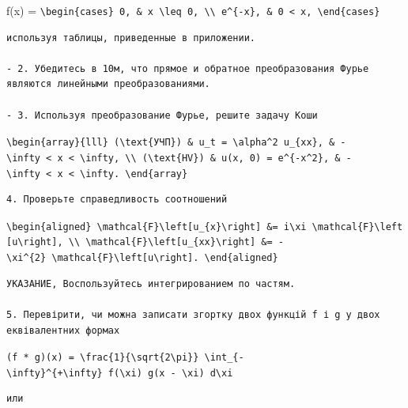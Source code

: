 \documentclass[
  ukrainian,
]{article}
\begin{document}
f(x) =
\texttt{\textbackslash{}begin\{cases\}\ 0,\ \&\ x\ \textbackslash{}leq\ 0,\ \textbackslash{}\textbackslash{}\ e\^{}\{-x\},\ \&\ 0\ \textless{}\ x,\ \textbackslash{}end\{cases\}}

\begin{verbatim}
используя таблицы, приведенные в приложении.

- 2. Убедитесь в 10м, что прямое и обратное преобразования Фурье являются линейными преобразованиями.

- 3. Используя преобразование Фурье, решите задачу Коши
\end{verbatim}

\texttt{\textbackslash{}begin\{array\}\{lll\}\ (\textbackslash{}text\{УЧП\})\ \&\ u\_t\ =\ \textbackslash{}alpha\^{}2\ u\_\{xx\},\ \&\ -\textbackslash{}infty\ \textless{}\ x\ \textless{}\ \textbackslash{}infty,\ \textbackslash{}\textbackslash{}\ (\textbackslash{}text\{HV\})\ \&\ u(x,\ 0)\ =\ e\^{}\{-x\^{}2\},\ \&\ -\textbackslash{}infty\ \textless{}\ x\ \textless{}\ \textbackslash{}infty.\ \textbackslash{}end\{array\}}

\begin{verbatim}
4. Проверьте справедливость соотношений
\end{verbatim}

\texttt{\textbackslash{}begin\{aligned\}\ \textbackslash{}mathcal\{F\}\textbackslash{}left{[}u\_\{x\}\textbackslash{}right{]}\ \&=\ i\textbackslash{}xi\ \textbackslash{}mathcal\{F\}\textbackslash{}left{[}u\textbackslash{}right{]},\ \textbackslash{}\textbackslash{}\ \textbackslash{}mathcal\{F\}\textbackslash{}left{[}u\_\{xx\}\textbackslash{}right{]}\ \&=\ -\textbackslash{}xi\^{}\{2\}\ \textbackslash{}mathcal\{F\}\textbackslash{}left{[}u\textbackslash{}right{]}.\ \textbackslash{}end\{aligned\}}

\begin{verbatim}
УКАЗАНИЕ, Воспользуйтесь интегрированием по частям.

5. Перевірити, чи можна записати згортку двох функцій f і g у двох еквівалентних формах
\end{verbatim}

\texttt{(f\ *\ g)(x)\ =\ \textbackslash{}frac\{1\}\{\textbackslash{}sqrt\{2\textbackslash{}pi\}\}\ \textbackslash{}int\_\{-\textbackslash{}infty\}\^{}\{+\textbackslash{}infty\}\ f(\textbackslash{}xi)\ g(x\ -\ \textbackslash{}xi)\ d\textbackslash{}xi}

\begin{verbatim}
или
\end{verbatim}
\end{document}
